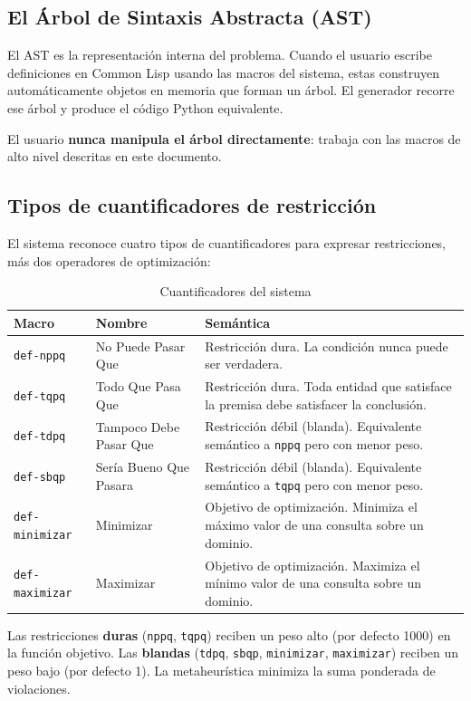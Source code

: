 \documentclass[12pt,a4paper]{article}
\newcommand{\code}[1]{\texttt{#1}}
\begin{document}
\subsection{El Árbol de Sintaxis Abstracta (AST)}

El AST es la representación interna del problema. Cuando el usuario
escribe definiciones en Common Lisp usando las macros del sistema, estas
construyen automáticamente objetos en memoria que forman un árbol. El
generador recorre ese árbol y produce el código Python equivalente.

El usuario \textbf{nunca manipula el árbol directamente}: trabaja con las
macros de alto nivel descritas en este documento.

\subsection{Tipos de cuantificadores de restricción}

El sistema reconoce cuatro tipos de cuantificadores para expresar
restricciones, más dos operadores de optimización:

\begin{table}[ht]
\centering
\caption{Cuantificadores del sistema}
\begin{tabular}{@{}lll@{}}
\toprule
\textbf{Macro} & \textbf{Nombre} & \textbf{Semántica} \\
\midrule
\code{def-nppq} & No Puede Pasar Que & Restricción dura.
  La condición nunca puede ser verdadera. \\
\code{def-tqpq} & Todo Que Pasa Que & Restricción dura.
  Toda entidad que satisface la premisa debe satisfacer la conclusión. \\
\code{def-tdpq} & Tampoco Debe Pasar Que & Restricción débil (blanda).
  Equivalente semántico a \code{nppq} pero con menor peso. \\
\code{def-sbqp} & Sería Bueno Que Pasara & Restricción débil (blanda).
  Equivalente semántico a \code{tqpq} pero con menor peso. \\
\code{def-minimizar} & Minimizar & Objetivo de optimización.
  Minimiza el máximo valor de una consulta sobre un dominio. \\
\code{def-maximizar} & Maximizar & Objetivo de optimización.
  Maximiza el mínimo valor de una consulta sobre un dominio. \\
\bottomrule
\end{tabular}
\end{table}

Las restricciones \textbf{duras} (\code{nppq}, \code{tqpq}) reciben un
peso alto (por defecto 1000) en la función objetivo. Las
\textbf{blandas} (\code{tdpq}, \code{sbqp}, \code{minimizar},
\code{maximizar}) reciben un peso bajo (por defecto 1). La
metaheurística minimiza la suma ponderada de violaciones.
\end{document}

